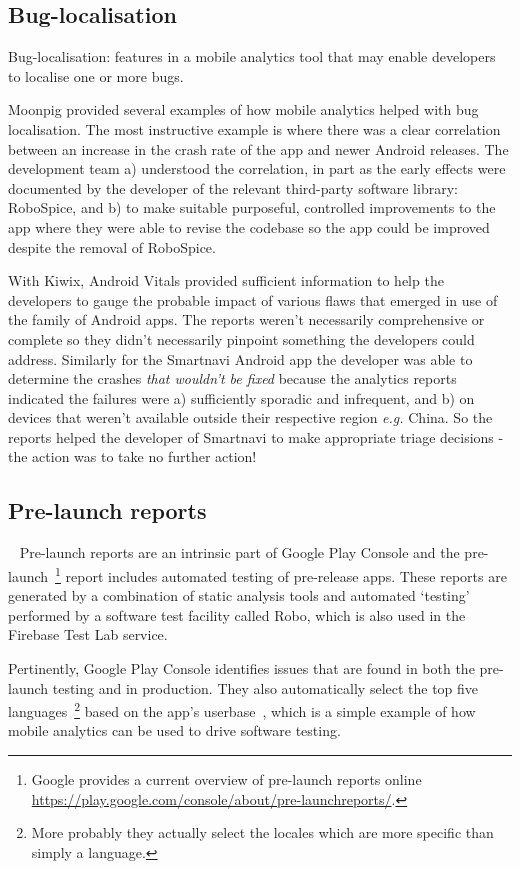 \subsection{Bug-localisation}
Bug-localisation: features in a mobile analytics tool that may enable developers to localise one or more bugs.

Moonpig provided several examples of how mobile analytics helped with bug localisation. The most instructive example is where there was a clear correlation between an increase in the crash rate of the app and newer Android releases. The development team a) understood the correlation, in part as the early effects were documented by the developer of the relevant third-party software library: RoboSpice, and b) to make suitable purposeful, controlled improvements to the app where they were able to revise the codebase so the app could be improved despite the removal of RoboSpice.

With Kiwix, Android Vitals provided sufficient information to help the developers to gauge the probable impact of various flaws that emerged in use of the family of Android apps. The reports weren't necessarily comprehensive or complete so they didn't necessarily pinpoint something the developers could address. Similarly for the Smartnavi Android app the developer was able to determine the crashes \emph{that wouldn't be fixed} because the analytics reports indicated the failures were a) sufficiently sporadic and infrequent, and b) on devices that weren't available outside their respective region \emph{e.g.} China. So the reports helped the developer of Smartnavi to make appropriate triage decisions - the action was to take no further action! 

\subsection{Pre-launch reports}~\label{tata-pre-launch-reports-topic}
Pre-launch reports are an intrinsic part of Google Play Console and the pre-launch~\footnote{Google provides a current overview of pre-launch reports online \url{https://play.google.com/console/about/pre-launchreports/}.} report includes automated testing of pre-release apps. These reports are generated by a combination of static analysis tools and automated `testing' performed by a software test facility called Robo, which is also used in the Firebase Test Lab service.

Pertinently, Google Play Console identifies issues that are found in both the pre-launch testing and in production. They also automatically select the top five languages~\footnote{More probably they actually select the locales which are more specific than simply a language.} based on the app's userbase~\citep{play_console_use_a_pre_launch_report_to_identify_issues_2022}, which is a simple example of how mobile analytics can be used to drive software testing.


